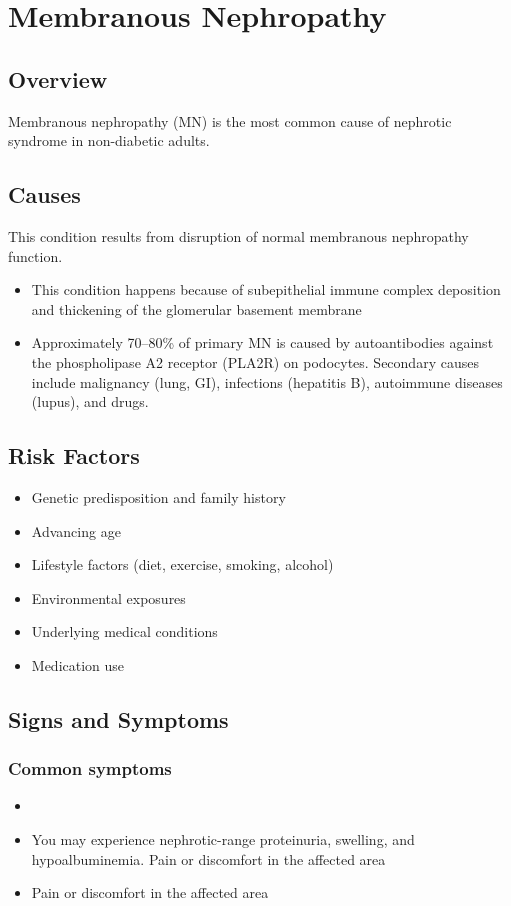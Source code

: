 \chapter{Membranous Nephropathy}
\label{sec:Membranous Nephropathy}

\section{Overview}
Membranous nephropathy (MN) is the most common cause of nephrotic syndrome in non-diabetic adults.
\section{Causes}
This condition results from disruption of normal membranous nephropathy function.

\begin{itemize}[noitemsep]
  \item This condition happens because of subepithelial immune complex deposition and thickening of the glomerular basement membrane
  \item Approximately 70--80\% of primary MN is caused by autoantibodies against the phospholipase A2 receptor (PLA2R) on podocytes. Secondary causes include malignancy (lung, GI), infections (hepatitis B), autoimmune diseases (lupus), and drugs.
\end{itemize}
\section{Risk Factors}


\begin{itemize}[noitemsep]
  \item Genetic predisposition and family history
  \item Advancing age
  \item Lifestyle factors (diet, exercise, smoking, alcohol)
  \item Environmental exposures
  \item Underlying medical conditions
  \item Medication use
\end{itemize}
\section{Signs and Symptoms}

\subsection{Common symptoms}
\begin{itemize}[noitemsep]
  \item \item You may experience nephrotic-range proteinuria, swelling, and hypoalbuminemia. Pain or discomfort in the affected area    \item Pain or discomfort in the affected area
  \end{itemize}

